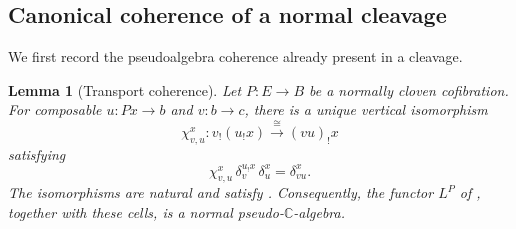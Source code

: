 \documentclass[11pt]{article}
\theoremstyle{plain}
\newtheorem{lemma}[theorem]{Lemma}
\theoremstyle{definition}
\theoremstyle{remark}
\newcommand{\C}{\mathbb{C}}
\numberwithin{equation}{section}
\begin{document}
\subsection{Canonical coherence of a normal cleavage}

We first record the pseudoalgebra coherence already present in a
cleavage.

\begin{lemma}[Transport coherence]\label{lem:transport-coherence}
Let $P\colon E\to B$ be a normally cloven cofibration.  For composable
$u\colon Px\to b$ and $v\colon b\to c$, there is a unique vertical
isomorphism
\begin{equation}
  \chi^x_{v,u}\colon v_!(u_!x)\xrightarrow{\ \cong\ }(vu)_!x
  \label{eq:cleavage-compositor}
\end{equation}
satisfying
\begin{equation}
  \chi^x_{v,u}\,
  \delta^{u_!x}_{v}\,
  \delta^x_u
  =\delta^x_{vu}.
  \label{eq:cleavage-compositor-characterization}
\end{equation}
The isomorphisms are natural and satisfy
.
Consequently, the functor $L^P$ of
, together with these cells, is a normal
pseudo-$\C$-algebra.
\end{lemma}
\end{document}
